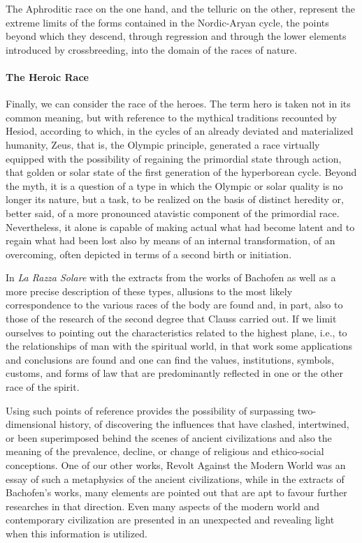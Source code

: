 The Aphroditic race on the one hand, and the telluric on the other, represent the extreme limits of the forms contained in the Nordic-Aryan cycle, the points beyond which they descend, through regression and through the lower elements introduced by crossbreeding, into the domain of the races of nature.

\paragraph{The Heroic Race}
Finally, we can consider the race of the heroes. The term hero is taken not in its common meaning, but with reference to the mythical traditions recounted by Hesiod, according to which, in the cycles of an already deviated and materialized humanity, Zeus, that is, the Olympic principle, generated a race virtually equipped with the possibility of regaining the primordial state through action, that golden or solar state of the first generation of the hyperborean cycle. Beyond the myth, it is a question of a type in which the Olympic or solar quality is no longer its nature, but a task, to be realized on the basis of distinct heredity or, better said, of a more pronounced atavistic component of the primordial race. Nevertheless, it alone is capable of making actual what had become latent and to regain what had been lost also by means of an internal transformation, of an overcoming, often depicted in terms of a second birth or initiation.

In \emph{La Razza Solare} with the extracts from the works of Bachofen as well as a more precise description of these types, allusions to the most likely correspondence to the various races of the body are found and, in part, also to those of the research of the second degree that Clauss carried out. If we limit ourselves to pointing out the characteristics related to the highest plane, i.e., to the relationships of man with the spiritual world, in that work some applications and conclusions are found and one can find the values, institutions, symbols, customs, and forms of law that are predominantly reflected in one or the other race of the spirit.

Using such points of reference provides the possibility of surpassing two-dimensional history, of discovering the influences that have clashed, intertwined, or been superimposed behind the scenes of ancient civilizations and also the meaning of the prevalence, decline, or change of religious and ethico-social conceptions. One of our other works, Revolt Against the Modern World was an essay of such a metaphysics of the ancient civilizations, while in the extracts of Bachofen's works, many elements are pointed out that are apt to favour further researches in that direction. Even many aspects of the modern world and contemporary civilization are presented in an unexpected and revealing light when this information is utilized.

